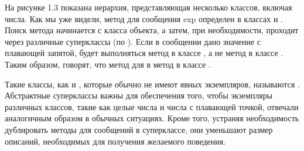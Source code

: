 На рисунке 1.3 показана иерархия, представляющая несколько классов, включая числа. 
Как мы уже видели, метод для сообщения exp определен в классах  и . 
Поиск метода начинается с класса объекта, а затем, при необходимости, проходит 
через различные суперклассы (по ). Если в сообщении  
дано значение с плавающей запятой, будет выполняться метод в классе , 
а не метод в классе . Таким образом, говорят, что метод для  в  
 метод в классе .


Такие классы, как  и , которые обычно не имеют явных экземпляров, 
называются . Абстрактные суперклассы важны для 
обеспечения того, чтобы экземпляры различных классов, такие как целые числа 
и числа с плавающей точкой, отвечали аналогичным образом в обычных ситуациях. 
Кроме того, устраняя необходимость дублировать методы для сообщений в 
суперклассе, они уменьшают размер описаний, необходимых для получения 
желаемого поведения.


\secup
